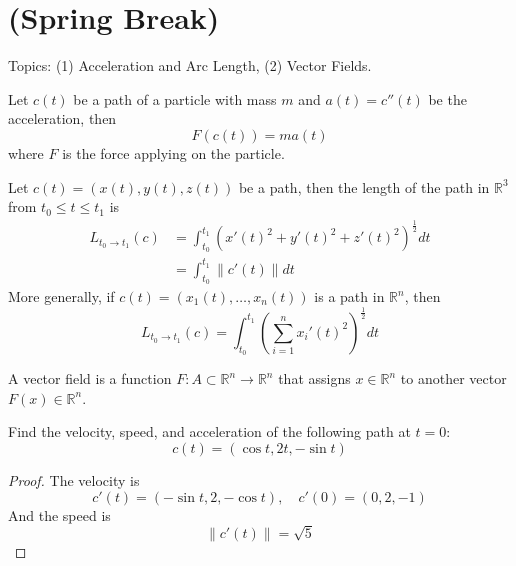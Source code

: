 \documentclass[openany]{book}
\newcommand{\R}{\mathbb{R}}
\begin{document}
\section*{\centering (Spring Break)}


\renewcommand\thesection{\arabic{section}}

\noindent
Topics: (1) Acceleration and Arc Length, (2) Vector Fields.

\begin{prop}
    Let $c(t)$ be a path of a particle with mass $m$ and $a(t)=c''(t)$ be the acceleration, then 
    \begin{equation*}
        F(c(t))=ma(t)
    \end{equation*}
    where $F$ is the force applying on the particle.
\end{prop}


\begin{defn}
    Let $c(t)=(x(t), y(t), z(t))$ be a path, then the length of the path in $\R^3$ from $t_0\leq t\leq t_1$ is 
    \begin{align*}
        L_{t_0\to t_1}(c)&=\int_{t_0}^{t_1}\left(x'(t)^2+y'(t)^2+z'(t)^2\right)^\frac{1}{2}dt\\
        &=\int_{t_0}^{t_1}\|c'(t)\|dt
    \end{align*}
    More generally, if $c(t)=(x_1(t), \dots, x_n(t))$ is a path in $\R^n$, then 
    \begin{equation*}
        L_{t_0\to t_1}(c)=\int_{t_0}^{t_1}\left(\sum_{i=1}^nx_i'(t)^2\right)^\frac{1}{2}dt
    \end{equation*}
\end{defn}


\begin{defn}
    A vector field is a function $F:A\subset\R^n\to\R^n$ that assigns $x\in\R^n$ to another vector $F(x)\in\R^n$.
\end{defn}







\begin{prob}
    Find the velocity, speed, and acceleration of the following path at $t=0$:
    \begin{equation*}
        c(t)=(\cos t, 2t, -\sin t)
    \end{equation*}
\end{prob}
\begin{proof}
    The velocity is 
    \begin{equation*}
        c'(t)=(-\sin t, 2, -\cos t), \quad c'(0)=(0,2,-1)
    \end{equation*}
    And the speed is 
    \begin{equation*}
        \|c'(t)\|=\sqrt{5}
    \end{equation*}
\end{proof}
\end{document}
